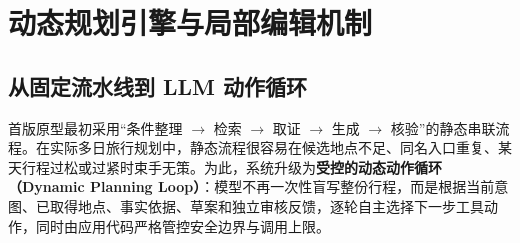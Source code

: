 \section{动态规划引擎与局部编辑机制}

\subsection{从固定流水线到 LLM 动作循环}

首版原型最初采用“条件整理 $\rightarrow$ 检索 $\rightarrow$ 取证 $\rightarrow$ 生成 $\rightarrow$ 核验”的静态串联流程。在实际多日旅行规划中，静态流程很容易在候选地点不足、同名入口重复、某天行程过松或过紧时束手无策。为此，系统升级为\textbf{受控的动态动作循环（Dynamic Planning Loop）}：模型不再一次性盲写整份行程，而是根据当前意图、已取得地点、事实依据、草案和独立审核反馈，逐轮自主选择下一步工具动作，同时由应用代码严格管控安全边界与调用上限。

